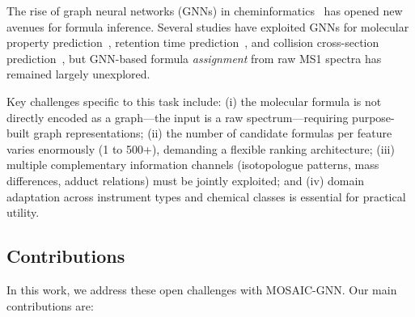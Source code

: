 \documentclass[journal=jcisd8]{achemso}
\begin{document}
The rise of graph neural networks (GNNs) in cheminformatics~\cite{Gilmer2017,Reif2019}
has opened new avenues for formula inference.  Several studies have exploited GNNs for
molecular property prediction~\cite{Yang2019}, retention time prediction~\cite{Bouwmeester2019},
and collision cross-section prediction~\cite{Mesleh1996}, but GNN-based formula
\emph{assignment} from raw MS1 spectra has remained largely unexplored.

Key challenges specific to this task include: (i) the molecular formula is not directly
encoded as a graph---the input is a raw spectrum---requiring purpose-built graph
representations; (ii) the number of candidate formulas per feature varies enormously
(1 to 500+), demanding a flexible ranking architecture; (iii) multiple complementary
information channels (isotopologue patterns, mass differences, adduct relations) must be
jointly exploited; and (iv) domain adaptation across instrument types and chemical classes
is essential for practical utility.

\subsection{Contributions}

In this work, we address these open challenges with MOSAIC-GNN.  Our main contributions are:
\end{document}
